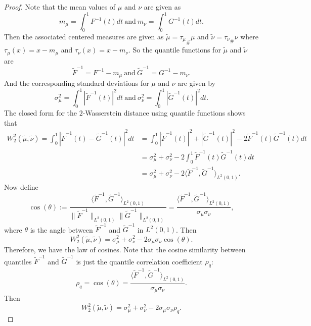 \documentclass[10pt,a4paper]{amsart}
\begin{document}
\begin{proof}
Note that the mean values of $\mu$ and $\nu$ are given as
$$
m_\mu = \int_0^1 F^{-1}(t)  dt \ \text{and} \ m_\nu = \int_0^1 G^{-1}(t) dt.
$$
Then the associated centered measures are given as $   \widetilde{\mu} = {\tau_\mu}_\# \mu $  and $ \widetilde{\nu} =  {\tau_\nu}_\# \nu$
where $\tau_\mu(x) = x -m_\mu$ and $\tau_\nu(x) = x -m_\nu$. So the quantile functions for $\widetilde{\mu}$ and $ \widetilde{\nu}$ are
$$
\widetilde{F}^{-1}= F^{-1} - m_\mu \ \text{and} \  \widetilde{G}^{-1} = G^{-1} - m_\nu.
$$
And the corresponding standard deviations for $\mu$ and $\nu$ are given by
$$
\sigma_\mu^2 = \int_0^1 |\widetilde{F}^{-1}(t)|^2 dt \ \text{and} \ \sigma_\nu^2 = \int_0^1 |\widetilde{G}^{-1}(t)|^2 dt.
$$ 
The closed form for the $2$-Wasserstein distance using quantile functions shows that
\[
\begin{aligned}
    W_2^2(\widetilde{\mu}, \widetilde{\nu}) = \int_0^1 |\widetilde{F}^{-1}(t) - \widetilde{G}^{-1}(t)|^2 dt &=  \int_0^1 |\widetilde{F}^{-1}(t)|^2 + |\widetilde{G}^{-1}(t)|^2 -2\widetilde{F}^{-1}(t)\widetilde{G}^{-1}(t)dt \\
    & = \sigma_\mu^2 + \sigma_\nu^2 -2 \int_0^1 \widetilde{F}^{-1}(t)\widetilde{G}^{-1}(t)dt \\
    & = \sigma_\mu^2 + \sigma_\nu^2 -2 \langle \widetilde{F}^{-1}, \widetilde{G}^{-1}\rangle_{L^2(0,1)}. 
\end{aligned}
\]
Now define  
$$
\cos (\theta) := \frac{\langle \widetilde{F}^{-1}, \widetilde{G}^{-1}\rangle_{L^2(0,1)}}{\| \widetilde{F}^{-1}\|_{L^2(0,1)} \| \widetilde{G}^{-1}\|_{L^2(0,1)}} = \frac{\langle \widetilde{F}^{-1}, \widetilde{G}^{-1}\rangle_{L^2(0,1)}}{\sigma_\mu \sigma_\nu},
$$
where $\theta$ is the angle between $\widetilde{F}^{-1}$ and $\widetilde{G}^{-1}$ in $L^2(0,1)$. 
Then 
\begin{equation*}
    W_2^2(\widetilde{\mu}, \widetilde{\nu})  = \sigma_\mu^2 + \sigma_\nu^2 -2 \sigma_\mu \sigma_\nu \cos (\theta).
\end{equation*}
Therefore, we have the law of cosines. 
Note that the cosine similarity between quantiles $\widetilde{F}^{-1}$ and $\widetilde{G}^{-1}$ is just the quantile correlation coefficient $\rho_q$:
$$
\rho_q = \cos (\theta) = \frac{\langle \widetilde{F}^{-1}, \widetilde{G}^{-1}\rangle_{L^2(0,1)} }{\sigma_\mu \sigma_\nu}.
$$
Then
\begin{equation*}
    W_2^2(\widetilde{\mu}, \widetilde{\nu})  = \sigma_\mu^2 + \sigma_\nu^2 -2 \sigma_\mu \sigma_\nu \rho_q.
\end{equation*}
\end{proof}
\end{document}
